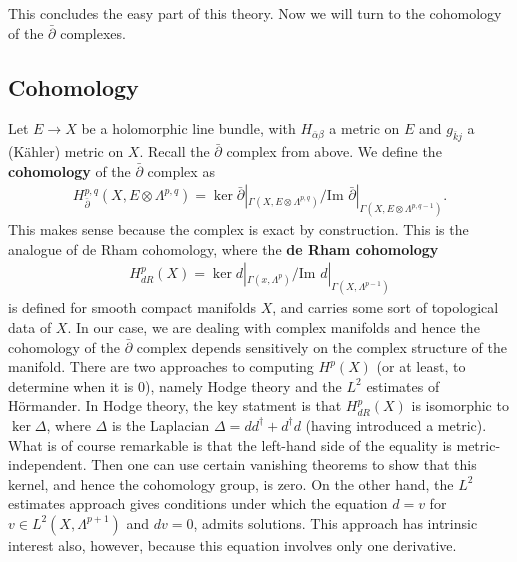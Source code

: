 \documentclass{../mathnotes}
\begin{document}
This concludes the easy part of this theory. Now we will turn to the cohomology of the $\bar\partial$ complexes.

\subsection*{Cohomology}

Let $E\to X$ be a holomorphic line bundle, with $H_{\bar\alpha\beta}$ a metric on $E$ and $g_{\bar kj}$ a (K\"ahler) metric on $X$.
Recall the $\bar\partial$ complex from above. We define the \textbf{cohomology} of the $\bar\partial$ complex as
\begin{align*}
    H^{p,q}_{\bar\partial}(X,E\otimes\Lambda^{p,q})=\ker\bar\partial|_{\Gamma(X,E\otimes\Lambda^{p,q})}/\text{Im }\bar\partial|_{\Gamma(X,E\otimes\Lambda^{p,q-1})}.
\end{align*}
This makes sense because the complex is exact by construction.
This is the analogue of de Rham cohomology, where the \textbf{de Rham cohomology}
\begin{align*}
    H^p_{dR}(X)=\ker d|_{\Gamma(x,\Lambda^p)}/\text{Im }d|_{\Gamma(X,\Lambda^{p-1})}
\end{align*}
is defined for smooth compact manifolds $X$, and carries some sort of topological data of $X$. In our case, we are dealing with complex manifolds
and hence the cohomology of the $\bar\partial$ complex depends sensitively on the complex structure of the manifold.
There are two approaches to computing $H^p(X)$ (or at least, to determine when it is 0), namely Hodge theory and the $L^2$ estimates
of H\"ormander. 
In Hodge theory, the key statment is that $H^{p}_{dR}(X)$ is isomorphic to $\ker\Delta$, where $\Delta$ is the Laplacian $\Delta=dd^\dagger+d^\dagger d$
(having introduced a metric). What is of course remarkable is that the left-hand side of the equality is metric-independent. Then one can use certain
vanishing theorems to show that this kernel, and hence the cohomology group, is zero.
On the other hand, the $L^2$ estimates approach gives conditions under which the equation $d=v$ for $v\in L^2(X,\Lambda^{p+1})$ and $dv=0$, admits solutions.
This approach has intrinsic interest also, however, because this equation involves only one derivative.
\end{document}
